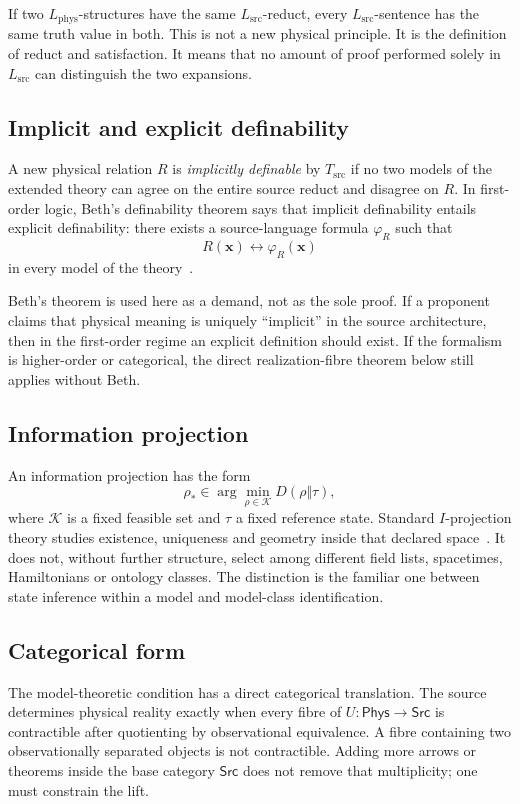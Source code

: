 \documentclass[10pt,a4paper]{article}
\theoremstyle{definition}
\theoremstyle{remark}
\newcommand{\Lsrc}{L_{\mathrm{src}}}
\newcommand{\Lphys}{L_{\mathrm{phys}}}
\newcommand{\Tsrc}{T_{\mathrm{src}}}
\newcommand{\Phys}{\mathsf{Phys}}
\newcommand{\Src}{\mathsf{Src}}
\begin{document}
If two \(\Lphys\)-structures have the same \(\Lsrc\)-reduct, every
\(\Lsrc\)-sentence has the same truth value in both.  This is not a new
physical principle.  It is the definition of reduct and satisfaction.  It
means that no amount of proof performed solely in \(\Lsrc\) can distinguish
the two expansions.

\subsection{Implicit and explicit definability}

A new physical relation \(R\) is \emph{implicitly definable} by \(\Tsrc\) if
no two models of the extended theory can agree on the entire source reduct and
disagree on \(R\).  In first-order logic, Beth's definability theorem says
that implicit definability entails explicit definability: there exists a
source-language formula \(\varphi_R\) such that
\[
R(\bm x)\longleftrightarrow\varphi_R(\bm x)
\]
in every model of the theory~\cite{Beth1953,Hodges1993}.

Beth's theorem is used here as a demand, not as the sole proof.  If a proponent
claims that physical meaning is uniquely ``implicit'' in the source
architecture, then in the first-order regime an explicit definition should
exist.  If the formalism is higher-order or categorical, the direct
realization-fibre theorem below still applies without Beth.

\subsection{Information projection}

An information projection has the form
\[
\rho_*\in\arg\min_{\rho\in\mathcal K}
D(\rho\Vert\tau),
\]
where \(\mathcal K\) is a fixed feasible set and \(\tau\) a fixed reference
state.  Standard \(I\)-projection theory studies existence, uniqueness and
geometry inside that declared space~\cite{KullbackLeibler,Csiszar1975}.  It
does not, without further structure, select among different field lists,
spacetimes, Hamiltonians or ontology classes.  The distinction is the familiar
one between state inference within a model and model-class identification.

\subsection{Categorical form}

The model-theoretic condition has a direct categorical translation.  The
source determines physical reality exactly when every fibre of
\(U:\Phys\to\Src\) is contractible after quotienting by observational
equivalence.  A fibre containing two observationally separated objects is not
contractible.  Adding more arrows or theorems inside the base category
\(\Src\) does not remove that multiplicity; one must constrain the lift.
\end{document}
